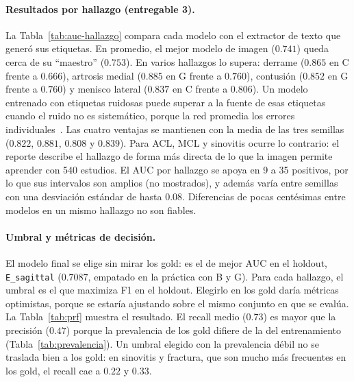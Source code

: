 \paragraph{Resultados por hallazgo (entregable 3).}
La Tabla~\ref{tab:auc-hallazgo} compara cada modelo con el extractor de texto que generó sus etiquetas.
En promedio, el mejor modelo de imagen ($0.741$) queda cerca de su ``maestro'' ($0.753$).
En varios hallazgos lo supera: derrame ($0.865$ en C frente a $0.666$), artrosis medial ($0.885$ en G frente a $0.760$), contusión ($0.852$ en G frente a $0.760$) y menisco lateral ($0.837$ en C frente a $0.806$).
Un modelo entrenado con etiquetas ruidosas puede superar a la fuente de esas etiquetas cuando el ruido no es sistemático, porque la red promedia los errores individuales~\cite{ratner2017snorkel}.
Las cuatro ventajas se mantienen con la media de las tres semillas ($0.822$, $0.881$, $0.808$ y $0.839$).
Para ACL, MCL y sinovitis ocurre lo contrario: el reporte describe el hallazgo de forma más directa de lo que la imagen permite aprender con 540 estudios.
El AUC por hallazgo se apoya en 9 a 35 positivos, por lo que sus intervalos son amplios (no mostrados), y además varía entre semillas con una desviación estándar de hasta $0.08$.
Diferencias de pocas centésimas entre modelos en un mismo hallazgo no son fiables.

\paragraph{Umbral y métricas de decisión.}
El modelo final se elige sin mirar los gold: es el de mejor AUC en el holdout, \texttt{E\_sagittal} ($0.7087$, empatado en la práctica con B y G).
Para cada hallazgo, el umbral es el que maximiza F1 en el holdout.
Elegirlo en los gold daría métricas optimistas, porque se estaría ajustando sobre el mismo conjunto en que se evalúa.
La Tabla~\ref{tab:prf} muestra el resultado.
El recall medio ($0.73$) es mayor que la precisión ($0.47$) porque la prevalencia de los gold difiere de la del entrenamiento (Tabla~\ref{tab:prevalencia}).
Un umbral elegido con la prevalencia débil no se traslada bien a los gold: en sinovitis y fractura, que son mucho más frecuentes en los gold, el recall cae a $0.22$ y $0.33$.

